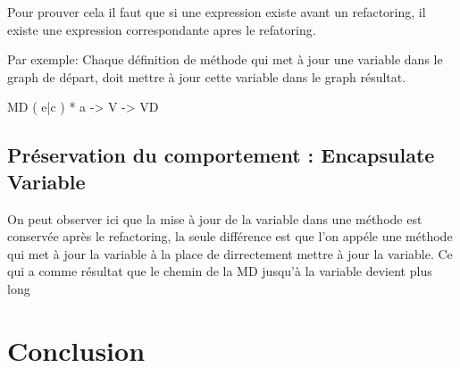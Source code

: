 \documentclass[a4paper, 10pt]{article}
\begin{document}
Pour prouver cela il faut que si une expression existe avant un refactoring, il existe une expression correspondante apres le refatoring. 

Par exemple: Chaque définition de méthode qui met à jour une variable dans le graph de départ, doit mettre à jour cette variable dans le graph résultat.

MD ( e|c ) * a -> V -> VD

\subsection{Préservation du comportement : Encapsulate Variable}

On peut observer ici que la mise à jour de la variable dans une méthode est conservée après le refactoring, la seule différence est que l'on appéle une méthode qui met à jour la variable à la place de
dirrectement mettre à jour la variable. Ce qui a comme résultat que le chemin de la MD jusqu'à la variable devient plus long


\section{Conclusion}
\end{document}
